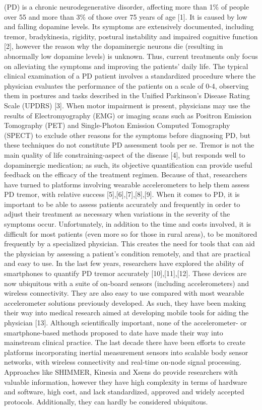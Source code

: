 (PD) is a chronic neurodegenerative disorder, affecting more than 1\% of people over 55 and more than 3\% of those over 75 years of age [1]. It is caused by low and falling dopamine levels. Its symptoms are extensively documented, including tremor, bradykinesia, rigidity, postural instability and impaired cognitive function [2], however the reason why the dopaminergic neurons die (resulting in abnormally low dopamine levels) is unknown. Thus, current treatments only focus on alleviating the symptoms and improving the patients’ daily life. 
The typical clinical examination of a PD patient involves a standardized procedure where the physician evaluates the performance of the patients on a scale of 0-4, observing them in postures and tasks described in the Unified Parkinson’s Disease Rating Scale (UPDRS) [3]. When motor impairment is present, physicians may use the results of Electromyography (EMG) or imaging scans such as Positron Emission Tomography (PET) and Single-Photon Emission Computed Tomography (SPECT) to exclude other reasons for the symptoms before diagnosing PD, but these techniques do not constitute PD assessment tools per se. 
Tremor is not the main quality of life constraining-aspect of the disease [4], but responds well to dopaminergic medication; as such, its objective quantification can provide useful feedback on the efficacy of the treatment regimen. Because of that, researchers have turned to platforms involving wearable accelerometers to help them assess PD tremor, with relative success [5],[6],[7],[8],[9]. 
When it comes to PD, it is important to be able to assess patients accurately and frequently in order to adjust their treatment as necessary when variations in the severity of the symptoms occur. Unfortunately, in addition to the time and costs involved, it is difficult for most patients (even more so for those in rural areas), to be monitored frequently by a specialized physician. This creates the need for tools that can aid the physician by assessing a patient’s condition remotely, and that are practical and easy to use. 
In the last few years, researchers have explored the ability of smartphones to quantify PD tremor accurately [10],[11],[12]. These devices are now ubiquitous with a suite of on-board sensors (including accelerometers) and wireless connectivity. They are also easy to use compared with most wearable accelerometer solutions previously developed. As such, they have been making their way into medical research aimed at developing mobile tools for aiding the physician [13]. 
Although scientifically important, none of the accelerometer- or smartphone-based methods proposed to date have made their way into mainstream clinical practice. The last decade there have been efforts to create platforms incorporating inertial measurement sensors into scalable body sensor networks, with wireless connectivity and real-time on-node signal processing. Approaches like SHIMMER, Kinesia and Xsens do provide researchers with valuable information, however they have high complexity in terms of hardware and software, high cost, and lack standardized, approved and widely accepted protocols. Additionally, they can hardly be considered ubiquitous. 
